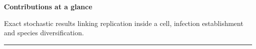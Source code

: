 \clearpage
{}
\label{oi:summary-redesigned}
\thispagestyle{plain}
\begingroup
\setlength{\parindent}{0pt}
\setlength{\parskip}{0pt}
\color{ink}
\hypersetup{linkcolor=oiaccent}
\newcommand{\oimapchapter}[2]{%
  {\sffamily\fontsize{9}{11}\selectfont\color{oisoft}%
   \hyperref[#1]{#2}}}
\newcommand{\oimaptitle}[2]{%
  {\sffamily\fontsize{12.5}{15}\selectfont\bfseries
   \textcolor{oiaccent}{#1}\hspace{0.65em}#2\par}}
\newcommand{\oimapcard}[4]{%
  \begin{minipage}[t]{0.477\linewidth}
    {\color{oirule}\rule{\linewidth}{0.5pt}\par}
    \vspace{5pt}
    \oimaptitle{#1}{#2}
    \vspace{3pt}
    #3\par
    \vspace{5pt}
    {\fontsize{10.5}{13.3}\selectfont\raggedright #4\par}
  \end{minipage}}

{\sffamily\fontsize{25}{29}\selectfont\bfseries
 Contributions at a glance\par}
\vspace{7pt}
{\fontsize{11}{14}\selectfont\color{oisoft}
 Exact stochastic results linking replication inside a cell, infection
 establishment and species diversification.\par}
\vspace{9pt}
{\color{oiaccent}\rule{\linewidth}{1pt}\par}
\vspace{11pt}

